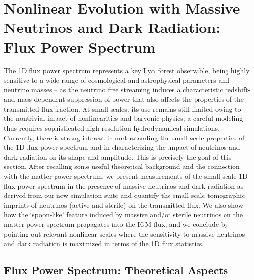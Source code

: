 \documentclass{emulateapj}
\begin{document}

 
\section{Nonlinear Evolution with Massive Neutrinos and Dark Radiation: Flux Power Spectrum} \label{section_nl_1d_ps}


The 1D flux power spectrum represents a key Ly$\alpha$ forest observable, 
being highly sensitive to  a wide range of cosmological and astrophysical parameters and neutrino masses -- as the neutrino free streaming  induces a 
characteristic redshift- and mass-dependent suppression of power that also affects the properties of the transmitted flux fraction.  
At small scales, its use remains still limited owing to the nontrivial impact of  
nonlinearities and baryonic physics; 
 a careful modeling thus requires  sophisticated 
high-resolution hydrodynamical simulations. 
Currently, there is strong interest in understanding the small-scale properties of the 1D flux power spectrum and in characterizing the impact of neutrinos
and dark radiation on its shape and amplitude. This is precisely the goal of this section.  
After recalling some useful theoretical background and the connection with the matter power spectrum, 
we present measurements of the small-scale 1D flux power spectrum in the presence of massive neutrinos and dark radiation as derived from our new simulation suite
and quantify the small-scale tomographic imprints of neutrinos (active and sterile) on the transmitted flux. 
We also show how the `spoon-like' feature induced by massive and/or sterile neutrinos on the matter power spectrum propagates into the 
IGM flux, and we conclude by pointing out relevant nonlinear scales 
where the sensitivity to massive neutrinos and dark radiation is maximized in terms of the 1D flux statistics. 


\subsection{Flux Power Spectrum: Theoretical Aspects}
\end{document}
